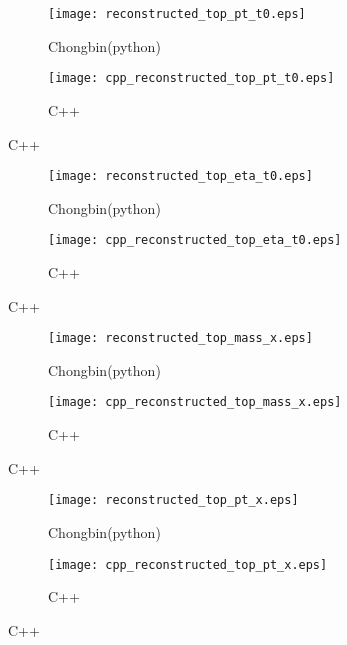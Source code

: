 \documentclass{beamer}
\begin{document}
\begin{frame}
  \begin{figure}[!h]
  \captionsetup[subfigure]{labelformat=empty}
  \begin{subfigure}{.5\textwidth}
  \centering
  \texttt{[image: reconstructed\_top\_pt\_t0.eps]}
  \caption{Chongbin(python)}
  \end{subfigure} \hfill
  \begin{subfigure}{.5\textwidth}
  \centering
  \texttt{[image: cpp\_reconstructed\_top\_pt\_t0.eps]}
  \caption{C++}
  \end{subfigure}
  \end{figure}
\end{frame}

\begin{frame}
  \begin{figure}[!h]
  \captionsetup[subfigure]{labelformat=empty}
  \begin{subfigure}{.5\textwidth}
  \centering
  \texttt{[image: reconstructed\_top\_eta\_t0.eps]}
  \caption{Chongbin(python)}
  \end{subfigure} \hfill
  \begin{subfigure}{.5\textwidth}
  \centering
  \texttt{[image: cpp\_reconstructed\_top\_eta\_t0.eps]}
  \caption{C++}
  \end{subfigure}
  \end{figure}
\end{frame}

\begin{frame}
  \begin{figure}[!h]
  \captionsetup[subfigure]{labelformat=empty}
  \begin{subfigure}{.5\textwidth}
  \centering
  \texttt{[image: reconstructed\_top\_mass\_x.eps]}
  \caption{Chongbin(python)}
  \end{subfigure} \hfill
  \begin{subfigure}{.5\textwidth}
  \centering
  \texttt{[image: cpp\_reconstructed\_top\_mass\_x.eps]}
  \caption{C++}
  \end{subfigure}
  \end{figure}
\end{frame}

\begin{frame}
  \begin{figure}[!h]
  \captionsetup[subfigure]{labelformat=empty}
  \begin{subfigure}{.5\textwidth}
  \centering
  \texttt{[image: reconstructed\_top\_pt\_x.eps]}
  \caption{Chongbin(python)}
  \end{subfigure} \hfill
  \begin{subfigure}{.5\textwidth}
  \centering
  \texttt{[image: cpp\_reconstructed\_top\_pt\_x.eps]}
  \caption{C++}
  \end{subfigure}
  \end{figure}
\end{frame}
\end{document}
